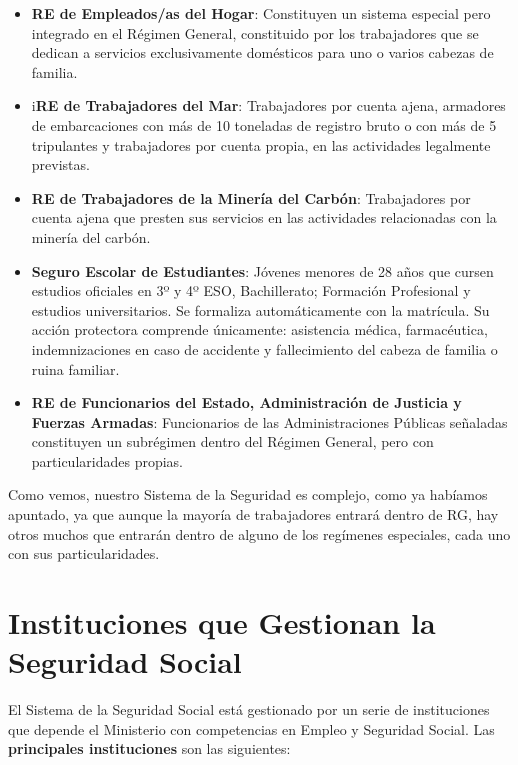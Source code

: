 \begin{enumerate}[label=(\alph*)]
\begin{itemize}
        \item \textbf{RE de Empleados/as del Hogar}: Constituyen un sistema especial pero integrado en el Régimen General, constituido por los trabajadores que se dedican a servicios exclusivamente domésticos para uno o varios cabezas de familia.

        \item i\textbf{RE de Trabajadores del Mar}: Trabajadores por cuenta ajena, armadores de embarcaciones con más de 10 toneladas de registro bruto o con más de 5 tripulantes y trabajadores por cuenta propia, en las actividades legalmente previstas.

        \item \textbf{RE de Trabajadores de la Minería del Carbón}: Trabajadores por cuenta ajena que presten sus servicios en las actividades relacionadas con la minería del carbón.

        \item \textbf{Seguro Escolar de Estudiantes}: Jóvenes menores de 28 años que cursen estudios oficiales en 3º y 4º ESO, Bachillerato; Formación Profesional y estudios universitarios. Se formaliza automáticamente con la matrícula. Su acción protectora comprende únicamente: asistencia médica, farmacéutica, indemnizaciones en caso de accidente y fallecimiento del cabeza de familia o ruina familiar.

        \item \textbf{RE de Funcionarios del Estado, Administración de Justicia y Fuerzas Armadas}: Funcionarios de las Administraciones Públicas señaladas constituyen un subrégimen dentro del Régimen General, pero con particularidades propias.
    \end{itemize}
\end{enumerate}

Como vemos, nuestro Sistema de la Seguridad es complejo, como ya habíamos apuntado, ya que aunque la mayoría de trabajadores entrará dentro de RG, hay otros muchos que entrarán dentro de alguno de los regímenes especiales, cada uno con sus particularidades.

\section{Instituciones que Gestionan la Seguridad Social}
El Sistema de la Seguridad Social está gestionado por un serie de instituciones que depende el Ministerio con competencias en Empleo y Seguridad Social. Las \textbf{principales instituciones} son las siguientes:

